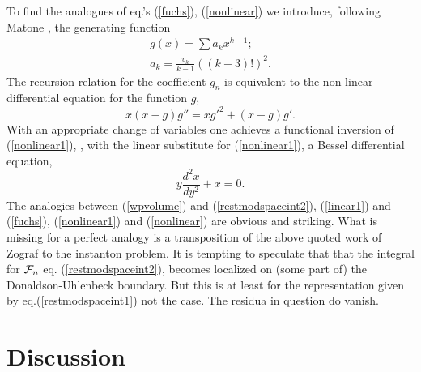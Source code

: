 \documentclass[a4paper,12pt]{article}
\begin{document}
To find the analogues of eq.'s (\ref{fuchs}), (\ref{nonlinear}) we 
introduce, following Matone \cite{matone2}, the generating function 
\begin{eqnarray}
g(x)=\sum a_k x^{k-1}; \nonumber \\
a_k=\frac{v_k}{k-1}\left((k-3)!\right)^2. \nonumber
\end{eqnarray}
The recursion relation for the coefficient $g_n$ is equivalent to 
the non-linear differential equation for the function $g$, \cite{matone2} 
\begin{equation}
x(x-g)g''=xg'^2+(x-g)g'.
\label{nonlinear1}
\end{equation}
With an appropriate change of variables one achieves a functional 
inversion of (\ref{nonlinear1}), \cite{kontsevich}, \cite{kmz} with 
the linear substitute for 
(\ref{nonlinear1}), a Bessel differential equation,
\begin{equation}
y\frac{d^2x}{dy^2}+x=0.
\label{linear1}
\end{equation}
The analogies between (\ref{wpvolume}) and (\ref{restmodspaceint2}), 
(\ref{linear1}) and (\ref{fuchs}), (\ref{nonlinear1}) and 
(\ref{nonlinear}) are obvious and striking. What is missing for a 
perfect analogy is a transposition of the above quoted work of 
Zograf to the instanton problem. It is tempting to speculate that 
that the integral for ${\cal F}_n$ eq. (\ref{restmodspaceint2}), 
becomes localized on (some part of) the Donaldson-Uhlenbeck boundary. 
But this is at least for the representation given by 
eq.(\ref{restmodspaceint1}) not the case. The residua in question do 
vanish. 

\section{Discussion}
\end{document}
